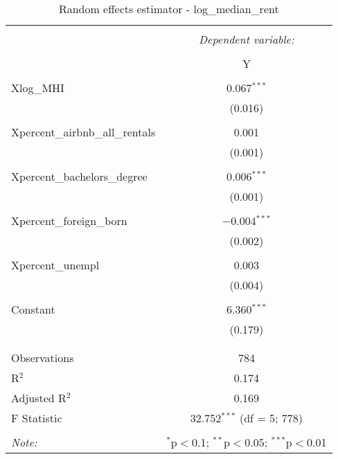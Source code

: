 \documentclass{article}
\begin{document}
\begin{table}[!htbp] \centering 
  \caption{Random effects estimator - log\_median\_rent} 
  \label{} 
  \begin{tabular}{@{\extracolsep{5pt}}lc} 
    \\[-1.8ex]\hline 
    \hline \\[-1.8ex] 
    & \multicolumn{1}{c}{\textit{Dependent variable:}} \\ 
    \cline{2-2} 
    \\[-1.8ex] & Y \\ 
    \hline \\[-1.8ex] 
    Xlog\_MHI & 0.067$^{***}$ \\ 
    & (0.016) \\ 
    & \\ 
    Xpercent\_airbnb\_all\_rentals & 0.001 \\ 
    & (0.001) \\ 
    & \\ 
    Xpercent\_bachelors\_degree & 0.006$^{***}$ \\ 
    & (0.001) \\ 
    & \\ 
    Xpercent\_foreign\_born & $-$0.004$^{***}$ \\ 
    & (0.002) \\ 
    & \\ 
    Xpercent\_unempl & 0.003 \\ 
    & (0.004) \\ 
    & \\ 
    Constant & 6.360$^{***}$ \\ 
    & (0.179) \\ 
    & \\ 
    \hline \\[-1.8ex] 
    Observations & 784 \\ 
    R$^{2}$ & 0.174 \\ 
    Adjusted R$^{2}$ & 0.169 \\ 
    F Statistic & 32.752$^{***}$ (df = 5; 778) \\ 
    \hline 
    \hline \\[-1.8ex] 
    \textit{Note:}  & \multicolumn{1}{r}{$^{*}$p$<$0.1; $^{**}$p$<$0.05; $^{***}$p$<$0.01} \\ 
  \end{tabular} 
\end{table} 
\end{document}

